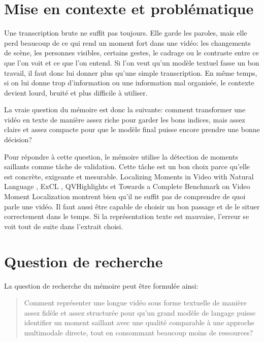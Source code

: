 \section{Mise en contexte et probl\'ematique}

Une transcription brute ne suffit pas toujours. Elle garde les paroles, mais elle perd beaucoup de ce qui rend un moment fort dans une vid\'eo: les changements de sc\`ene, les personnes visibles, certains gestes, le cadrage ou le contraste entre ce que l'on voit et ce que l'on entend. Si l'on veut qu'un mod\`ele textuel fasse un bon travail, il faut donc lui donner plus qu'une simple transcription. En m\^eme temps, si on lui donne trop d'information ou une information mal organis\'ee, le contexte devient lourd, bruit\'e et plus difficile \`a utiliser.

La vraie question du m\'emoire est donc la suivante: comment transformer une vid\'eo en texte de mani\`ere assez riche pour garder les bons indices, mais assez claire et assez compacte pour que le mod\`ele final puisse encore prendre une bonne d\'ecision?

Pour r\'epondre \`a cette question, le m\'emoire utilise la d\'etection de moments saillants comme t\^ache de validation. Cette t\^ache est un bon choix parce qu'elle est concr\`ete, exigeante et mesurable. Localizing Moments in Video with Natural Language \cite{anonymous2017_localizing}, ExCL \cite{ghosh2019_excl}, QVHighlights \cite{lei2021_moments} et Towards a Complete Benchmark on Video Moment Localization \cite{chae2024_benchmark} montrent bien qu'il ne suffit pas de comprendre de quoi parle une vid\'eo. Il faut aussi \^etre capable de choisir un bon passage et de le situer correctement dans le temps. Si la repr\'esentation texte est mauvaise, l'erreur se voit tout de suite dans l'extrait choisi.

\section{Question de recherche}

La question de recherche du m\'emoire peut \^etre formul\'ee ainsi:

\begin{quote}
Comment repr\'esenter une longue vid\'eo sous forme textuelle de mani\`ere assez fid\`ele et assez structur\'ee pour qu'un grand mod\`ele de langage puisse identifier un moment saillant avec une qualit\'e comparable \`a une approche multimodale directe, tout en consommant beaucoup moins de ressources?
\end{quote}

